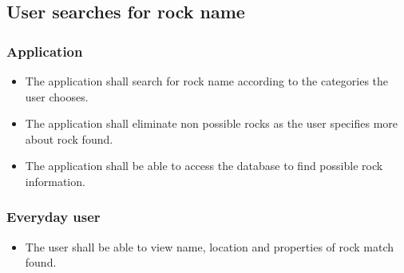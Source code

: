 \documentclass[12pt]{article}
\begin{document}
\subsection{User searches for rock name}
\subsubsection{Application}
\begin{itemize}

  \item The application shall search for rock name according to the categories the user chooses.
  \item The application shall eliminate non possible rocks as the user specifies more about rock found. 
  \item The application shall be able to access the database to find possible rock information. 
  \end{itemize}
    \subsubsection{Everyday user}
  \begin{itemize}
  \item The user shall be able to view name, location and properties of rock match found. 
\end{itemize}
\end{document}
